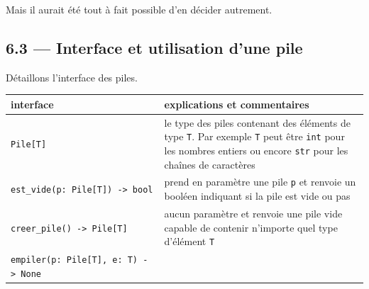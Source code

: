 \documentclass[a4paper,17pt]{extarticle}
\begin{document}
Mais il aurait été tout à fait possible d'en décider autrement.

    \hypertarget{interface-et-utilisation-dune-pile}{%
\subsection{6.3 --- Interface et utilisation d'une
pile}\label{interface-et-utilisation-dune-pile}}

    Détaillons l'interface des piles.

\begin{longtable}[]{@{}ll@{}}
\toprule
\begin{minipage}[b]{0.47\columnwidth}\raggedright
interface\strut
\end{minipage} & \begin{minipage}[b]{0.47\columnwidth}\raggedright
explications et commentaires\strut
\end{minipage}\tabularnewline
\midrule
\endhead
\begin{minipage}[t]{0.47\columnwidth}\raggedright
\texttt{Pile{[}T{]}}\strut
\end{minipage} & \begin{minipage}[t]{0.47\columnwidth}\raggedright
le type des piles contenant des éléments de type \texttt{T}. Par exemple
\texttt{T} peut être \texttt{int} pour les nombres entiers ou encore
\texttt{str} pour les chaînes de caractères\strut
\end{minipage}\tabularnewline
\begin{minipage}[t]{0.47\columnwidth}\raggedright
\texttt{est\_vide(p:\ Pile{[}T{]})\ -\textgreater{}\ bool}\strut
\end{minipage} & \begin{minipage}[t]{0.47\columnwidth}\raggedright
prend en paramètre une pile \texttt{p} et renvoie un booléen indiquant
si la pile est vide ou pas\strut
\end{minipage}\tabularnewline
\begin{minipage}[t]{0.47\columnwidth}\raggedright
\texttt{creer\_pile()\ -\textgreater{}\ Pile{[}T{]}}\strut
\end{minipage} & \begin{minipage}[t]{0.47\columnwidth}\raggedright
aucun paramètre et renvoie une pile vide capable de contenir n'importe
quel type d'élément \texttt{T}\strut
\end{minipage}\tabularnewline
\begin{minipage}[t]{0.47\columnwidth}\raggedright
\texttt{empiler(p:\ Pile{[}T{]},\ e:\ T)\ -\textgreater{}\ None}\strut

\end{minipage}
\end{longtable}
\end{document}
